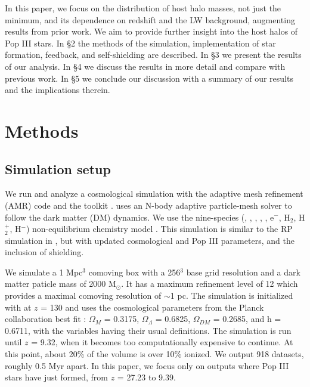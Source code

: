 \documentclass[a4paper,fleqn,usenatbib]{mnras}
\begin{document}
In this paper, we focus on the distribution of host halo masses, not just the minimum, and its dependence on redshift and the LW background, augmenting results from prior work. We aim to provide further insight into the host halos of Pop III stars. In \S 2 the methods of the simulation, implementation of star formation, feedback, and \hh{} self-shielding are described. In \S 3 we present the results of our analysis. In \S 4 we discuss the results in more detail and compare with previous work. In \S 5 we conclude our discussion with a summary of our results and the implications therein.

\section{Methods}
\subsection{Simulation setup}
We run and analyze a cosmological simulation with the adaptive mesh refinement (AMR) code \enzo{} \citep{Enzo} and the toolkit \yt{} \citep{yt_full_paper}. \enzo{} uses an N-body adaptive particle-mesh solver \citep{Efstathiou85, Couchman91, BryanNorman1997} to follow the dark matter (DM) dynamics. We use the nine-species (\hi, \hii, \hei, \heii, \heiii, e$^{-}$, H$_{2}$, H$_{2}^{+}$, H$^{-}$) non-equilibrium chemistry model \citep{Abel97, Anninos97}. This simulation is similar to the RP simulation in \citet[hereafter W12]{Wise12_RP}, but with updated cosmological and Pop III parameters, and the inclusion of \hh{} shielding.

We simulate a 1 Mpc$^{3}$ comoving box with a 256$^{3}$ base grid 
resolution and a dark matter paticle mass of 2000 M$_{\odot}$. It has a maximum refinement level of 12 which provides a maximal comoving resolution of $\sim$1 pc. The simulation is 
initialized with \music{} \citep{Hahn11_MUSIC} at $z$ = 130 and uses the cosmological parameters from the Planck collaboration best fit 
\citet{Planck13_Cosmo}: $\Omega_{M}$ = 0.3175, $\Omega_{\Lambda}$ = 
0.6825, $\Omega_{DM}$ = 0.2685, and h = 0.6711, with the variables 
having their usual definitions. The simulation is run until $z$ = 9.32, when it becomes too computationally expensive to continue. At this point, about 20\% of the volume is over 10\% ionized. We output 918 datasets,  roughly 0.5 Myr apart. In this paper, we focus only on outputs where Pop III stars have just formed, from $z$ = 27.23 to 9.39. 
\end{document}
